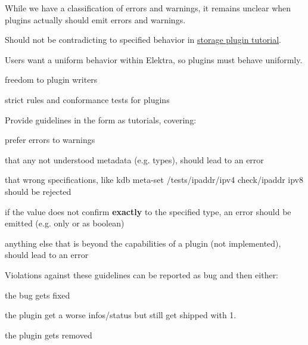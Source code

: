 While we have a classification of errors and warnings, it remains unclear when plugins actually should emit errors and warnings.


\begin{DoxyItemize}
\item Should not be contradicting to specified behavior in \hyperlink{doc_tutorials_storage-plugins_md}{storage plugin tutorial}.
\end{DoxyItemize}


\begin{DoxyItemize}
\item Users want a uniform behavior within Elektra, so plugins must behave uniformly.
\end{DoxyItemize}


\begin{DoxyItemize}
\item freedom to plugin writers
\item strict rules and conformance tests for plugins
\end{DoxyItemize}

Provide guidelines in the form as tutorials, covering\+:


\begin{DoxyItemize}
\item prefer errors to warnings
\item that any not understood metadata (e.\+g. types), should lead to an error
\item that wrong specifications, like {\ttfamily kdb meta-\/set /tests/ipaddr/ipv4 check/ipaddr ipv8} should be rejected
\item if the value does not confirm {\bfseries exactly} to the specified type, an error should be emitted (e.\+g. only {} or {} as boolean)
\item anything else that is beyond the capabilities of a plugin (not implemented), should lead to an error
\end{DoxyItemize}

Violations against these guidelines can be reported as bug and then either\+:


\begin{DoxyItemize}
\item the bug gets fixed
\item the plugin get a worse {\ttfamily infos/status} but still get shipped with 1.
\item the plugin gets removed
\end{DoxyItemize}

